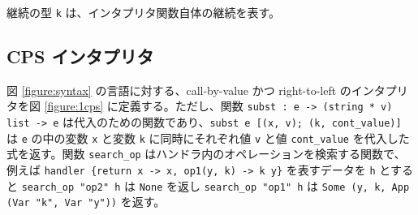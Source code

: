 継続の型 \texttt{k} は、インタプリタ関数自体の継続を表す。

\subsection{CPS インタプリタ}
\label{subsection:1cps}

図 \ref{figure:syntax} の言語に対する、call-by-value かつ right-to-left のインタプリタを図 \ref{figure:1cps} に定義する。ただし、関数 \texttt{subst :\ e -> (string * v) list -> e} は代入のための関数であり、\texttt{subst e [(x, v); (k, cont\_value)]} は \texttt{e} の中の変数 \texttt{x} と変数 \texttt{k} に同時にそれぞれ値 \texttt{v} と値 \texttt{cont\_value} を代入した式を返す。関数 \texttt{search\_op} はハンドラ内のオペレーションを検索する関数で、例えば \texttt{handler \{return x -> x, op1(y, k) -> k y\}} を表すデータを \texttt{h} とすると \texttt{search\_op "op2" h} は \texttt{None} を返し \texttt{search\_op "op1" h} は \texttt{Some (y, k, App (Var "k", Var "y"))} を返す。

